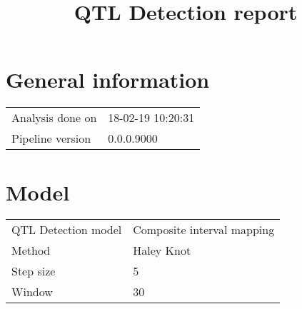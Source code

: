\documentclass[a4paper,11pt]{article}\usepackage[]{graphicx}\usepackage[]{color}
\title{QTL Detection report}%
\author{\vspace{-5ex}}
\date{\vspace{-5ex}}
\begin{document}


\maketitle
\singlespacing

\section{General information}
\begin{table}[ht]
\begin{flushleft}
\begin{tabular}{ll}
  Analysis done on & 18-02-19 10:20:31 \\ 
  Pipeline version & 0.0.0.9000 \\ 
  \end{tabular}
\label{general}
\end{flushleft}
\end{table}

\section{Model}
\begin{table}[ht]
\begin{flushleft}
\begin{tabular}{ll}
  QTL Detection model & Composite interval mapping \\ 
  Method & Haley Knot \\ 
  Step size & 5 \\ 
  Window & 30 \\ 
  \end{tabular}
\label{model}
\end{flushleft}
\end{table}

\end{document}
